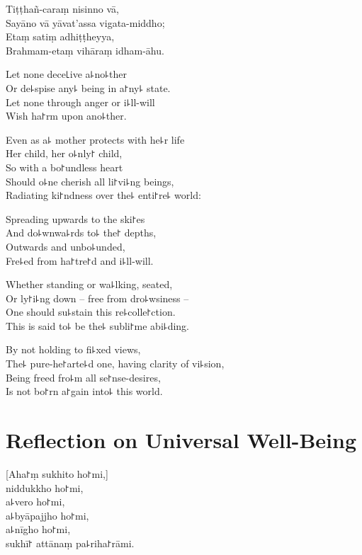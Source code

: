 Tiṭṭhañ-caraṃ nisinno vā,\\
Sayāno vā yāvat'assa vigata-middho;\\
Etaṃ satiṃ adhiṭṭheyya,\\
Brahmam-etaṃ vihāraṃ idham-āhu.


\clearpage

Let none dece꜖ive a꜕no꜕ther\\%
Or de꜕spise any꜕ being in a꜓ny꜕ state.\\
Let none through anger or i꜕ll-will\\
Wish ha꜓rm upon ano꜕ther.

Even as a꜕ mother protects with he꜕r life\\
Her child, her o꜕nly꜓ child,\\
So with a bo꜓undless heart\\
Should o꜕ne cherish all li꜓vi꜕ng beings,\\
Radiating ki꜓ndness over the꜕ enti꜓re꜕ world:

Spreading upwards to the ski꜓es\\
And do꜕wnwa꜕rds to꜕ the꜓ depths,\\
Outwards and unbo꜕unded,\\
Fre꜕ed from ha꜓tre꜓d and i꜕ll-will.

Whether standing or wa꜕lking, seated, \\
Or ly꜓i꜕ng down -- free from dro꜕wsiness --\\
One should su꜕stain this re꜕colle꜓ction.\\
This is said to꜕ be the꜕ subli꜓me abi꜕ding.

By not holding to fi꜕xed views,\\
The꜕ pure-he꜓arte꜕d one, having clarity of vi꜕sion,\\
Being freed fro꜕m all se꜓nse-desires,\\
Is not bo꜓rn a꜓gain into꜕ this world.

\chapter[Universal Well-Being]{Reflection on Universal Well-Being}%

\begin{leader}
\end{leader}

[Aha꜓ṃ sukhito ho꜓mi,]\\
niddukkho ho꜓mi,\\
a꜕vero ho꜓mi,\\
a꜕byāpajjho ho꜓mi,\\
a꜕nīgho ho꜓mi,\\
sukhī꜓ attānaṃ pa꜕riha꜓rāmi.

